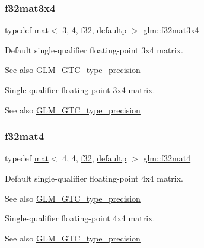 \subsubsection{\texorpdfstring{f32mat3x4}{f32mat3x4}}
{\footnotesize\ttfamily typedef \mbox{\hyperlink{structglm_1_1mat}{mat}}$<$ 3, 4, \mbox{\hyperlink{group__gtc__type__precision_ga0ec999b57f5330d9021256e96038df04}{f32}}, \mbox{\hyperlink{namespaceglm_a36ed105b07c7746804d7fdc7cc90ff25a9d21ccd8b5a009ec7eb7677befc3bf51}{defaultp}} $>$ \mbox{\hyperlink{group__gtc__type__precision_ga8459d79e94eb107e31f0ee600e9bae3f}{glm\+::f32mat3x4}}}

Default single-\/qualifier floating-\/point 3x4 matrix. \begin{DoxySeeAlso}{See also}
\mbox{\hyperlink{group__gtc__type__precision}{G\+L\+M\+\_\+\+G\+T\+C\+\_\+type\+\_\+precision}}
\end{DoxySeeAlso}
Single-\/qualifier floating-\/point 3x4 matrix. \begin{DoxySeeAlso}{See also}
\mbox{\hyperlink{group__gtc__type__precision}{G\+L\+M\+\_\+\+G\+T\+C\+\_\+type\+\_\+precision}} 
\end{DoxySeeAlso}
\mbox{\label{group__gtc__type__precision_ga4f0717d91e376ba76e675324dbe21576}} 
\subsubsection{\texorpdfstring{f32mat4}{f32mat4}}
{\footnotesize\ttfamily typedef \mbox{\hyperlink{structglm_1_1mat}{mat}}$<$ 4, 4, \mbox{\hyperlink{group__gtc__type__precision_ga0ec999b57f5330d9021256e96038df04}{f32}}, \mbox{\hyperlink{namespaceglm_a36ed105b07c7746804d7fdc7cc90ff25a9d21ccd8b5a009ec7eb7677befc3bf51}{defaultp}} $>$ \mbox{\hyperlink{group__gtc__type__precision_ga4f0717d91e376ba76e675324dbe21576}{glm\+::f32mat4}}}

Default single-\/qualifier floating-\/point 4x4 matrix. \begin{DoxySeeAlso}{See also}
\mbox{\hyperlink{group__gtc__type__precision}{G\+L\+M\+\_\+\+G\+T\+C\+\_\+type\+\_\+precision}}
\end{DoxySeeAlso}
Single-\/qualifier floating-\/point 4x4 matrix. \begin{DoxySeeAlso}{See also}
\mbox{\hyperlink{group__gtc__type__precision}{G\+L\+M\+\_\+\+G\+T\+C\+\_\+type\+\_\+precision}} 
\end{DoxySeeAlso}
\mbox{\label{group__gtc__type__precision_gab0498cc84bb77002f41630e3cd0be87b}} 
